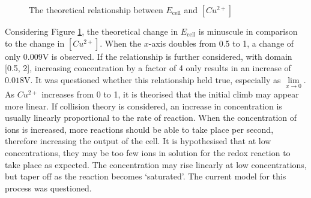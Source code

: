 \documentclass[11pt,a4paper]{article}
\begin{document}
\begin{figure}

	\centering 

	

 
		\caption{The theoretical relationship between $E_{\textrm{cell}}$ and $[Cu^{2+}]$}
		\label{ogLog}
\end{figure}
\newpage
Considering Figure \ref{ogLog}, the theoretical change in $E_\textrm{cell}$ is minuscule in comparison to the change in $[Cu^{2+}]$. When the $x$-axis doubles from 0.5 to 1, a change of only $0.009$V is observed. If the relationship is further considered, with domain [0.5, 2], increasing concentration by a factor of 4 only results in an increase of $0.018$V. 
It was questioned whether this relationship held true, especially as $\lim\limits_{x\to 0}$.
As $Cu^{2+}$ increases from 0 to 1, it is theorised that the initial climb may appear more linear. If collision theory is considered, an increase in concentration is usually linearly proportional to the rate of reaction. When the concentration of ions is increased, more reactions should be able to take place per second, therefore increasing the output of the cell. It is hypothesised that at low concentrations, they may be too few ions in solution for the redox reaction to take place as expected. The concentration may rise linearly at low concentrations, but taper off as the reaction becomes `saturated'. The current model for this process was questioned.
\end{document}

